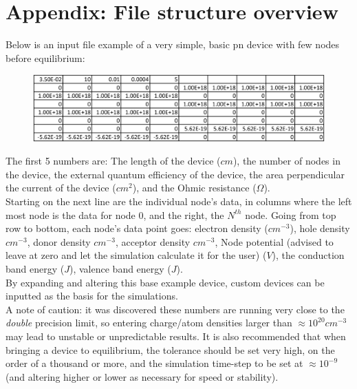 \documentclass[titlepage]{article}
\begin{document}
\section{Appendix: File structure overview}\label{sec:fileStruct}
Below is an input file example of a very simple, basic pn device with few nodes before equilibrium:
\begin{figure}[H]
	\centering
	\includegraphics[scale=0.8]{Figures/example_device}
\end{figure}
The first 5 numbers are: The length of the device ($cm$), the number of nodes in the device, the external quantum efficiency of the device, the area perpendicular the current of the device ($cm^2$), and the Ohmic resistance ($\Omega$). \\
Starting on the next line are the individual node's data, in columns where the left most node is the data for node 0, and the right, the $N^{th}$ node. Going from top row to bottom, each node's data point goes: electron density ($cm^{-3}$), hole density $cm^{-3}$, donor density $cm^{-3}$, acceptor density $cm^{-3}$, Node potential (advised to leave at zero and let the simulation calculate it for the user) ($V$), the conduction band energy ($J$), valence band energy ($J$).\\
By expanding and altering this base example device, custom devices can be inputted as the basis for the simulations.\\
A note of caution: it was discovered these numbers are running very close to the \textit{double} precision limit, so entering charge/atom densities larger than $\approx 10^{20} cm^{-3}$ may lead to unstable or unpredictable results. It is also recommended that when bringing a device to equilibrium, the tolerance should be set very high, on the order of a thousand or more, and the simulation time-step to be set at $\approx 10^{-9}$ (and altering higher or lower as necessary for speed or stability).
\end{document}
